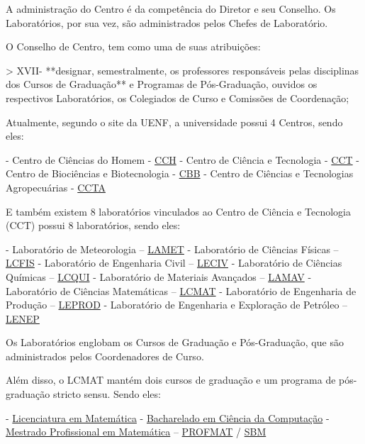     A administração do Centro é da competência do Diretor e seu Conselho. Os Laboratórios, por sua vez, são administrados pelos Chefes de Laboratório.

    O Conselho de Centro, tem como uma de suas atribuições:

    > XVII- **designar, semestralmente, os professores responsáveis pelas disciplinas dos Cursos de Graduação** e Programas de Pós-Graduação, ouvidos os respectivos Laboratórios, os Colegiados de Curso e Comissões de Coordenação;

    Atualmente, segundo o site da UENF, a universidade possui 4 Centros, sendo eles:

    - Centro de Ciências do Homem - \href{https://uenf.br/}{CCH}
    - Centro de Ciência e Tecnologia - \href{https://uenf.br/cct/}{CCT}
    - Centro de Biociências e Biotecnologia - \href{https://uenf.br/}{CBB}
    - Centro de Ciências e Tecnologias Agropecuárias - \href{https://uenf.br/}{CCTA}

    E também existem 8 laboratórios vinculados ao Centro de Ciência e Tecnologia (CCT) possui 8 laboratórios, sendo eles:

    - Laboratório de Meteorologia – \href{https://uenf.br/cct/administracao/laboratorios/}{LAMET}
    - Laboratório de Ciências Físicas – \href{https://uenf.br/cct/lcmat/}{LCFIS}
    - Laboratório de Engenharia Civil – \href{https://uenf.br/cct/administracao/laboratorios/}{LECIV}
    - Laboratório de Ciências Químicas – \href{https://uenf.br/cct/administracao/laboratorios/}{LCQUI}
    - Laboratório de Materiais Avançados – \href{https://uenf.br/cct/administracao/laboratorios/}{LAMAV}
    - Laboratório de Ciências Matemáticas – \href{https://uenf.br/cct/administracao/laboratorios/}{LCMAT}
    - Laboratório de Engenharia de Produção – \href{https://uenf.br/cct/administracao/laboratorios/}{LEPROD}
    - Laboratório de Engenharia e Exploração de Petróleo – \href{https://uenf.br/cct/administracao/laboratorios/}{LENEP}

    Os Laboratórios englobam os Cursos de Graduação e Pós-Graduação, que são administrados pelos Coordenadores de Curso.

    Além disso, o LCMAT mantém dois cursos de graduação e um programa de pós-graduação stricto sensu. Sendo eles:

    - \href{https://uenf.br/posgraduacao/licenciatura-matematica/}{Licenciatura em Matemática}
    - \href{https://cc.uenf.br/}{Bacharelado em Ciência da Computação}
    - \href{https://uenf.br/posgraduacao/matematica/apresentacao/}{Mestrado Profissional em Matemática} – \href{https://uenf.br/posgraduacao/programas/pos-graduacao-stricto-sensu/}{PROFMAT} / \href{https://www.profmat-sbm.org.br/}{SBM}

